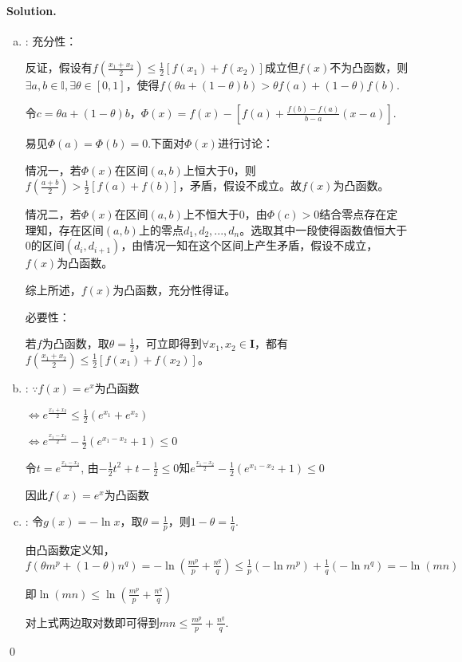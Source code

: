\documentclass[a4paper]{article}
\newenvironment{solution}
{\color{blue} \paragraph{Solution.}}
{\newline \qed}
\begin{document}
\begin{solution}
    \begin{enumerate}[a)]
        \item : 充分性：
        
                反证，假设有$f\left(\frac{x_1+x_2}{2}\right)\leq \frac{1}{2}[f(x_1)+f(x_2)]$成立但$f(x)$不为凸函数，则$\exists a,b\in\mathbb{I},\exists \theta\in[0,1]$，使得$f(\theta a+(1-\theta)b)>\theta f(a)+(1-\theta)f(b)$.

                令$c = \theta a+ (1-\theta)b$，$\Phi(x)=f(x)-\left[f(a)+\frac{f(b)-f(a)}{b-a}(x-a)\right]$.

                易见$\Phi(a)=\Phi(b)=0$.下面对$\Phi(x)$进行讨论：

                情况一，若$\Phi(x)$在区间$(a, b)$上恒大于0，则$f(\frac{a+b}2)>\frac 12\left[f(a)+f(b)\right]$，矛盾，假设不成立。故$f(x)$为凸函数。

                情况二，若$\Phi(x)$在区间$(a, b)$上不恒大于0，由$\Phi(c)>0$结合零点存在定理知，存在区间$(a, b)$上的零点$d_1, d_2, ...,d_n$。选取其中一段使得函数值恒大于0的区间$(d_i, d_{i+1})$，由情况一知在这个区间上产生矛盾，假设不成立，$f(x)$为凸函数。

                综上所述，$f(x)$为凸函数，充分性得证。

                必要性：

                若$f$为凸函数，取$\theta=\frac 12$，可立即得到$\forall x_1,x_2\in\mathbf{I}$，都有$f\left(\frac{x_1+x_2}{2}\right)\leq \frac{1}{2}[f(x_1)+f(x_2)]$。
        
        \item : $\because f(x)=e^x$为凸函数
        
                $\Leftrightarrow e^{\frac{x_1+x_2}2}\leq \frac 12(e^{x_1}+e^{x_2})$

                $\Leftrightarrow e^{\frac{x_1-x_2}2}-\frac 12(e^{x_1-x_2}+1)\leq 0$

                令$t=e^\frac {x_1-x_2}2$, 由$-\frac 12 t^2+t-\frac 12\leq 0$知$e^{\frac{x_1-x_2}2}-\frac 12(e^{x_1-x_2}+1)\leq 0$

                因此$f(x)=e^x$为凸函数

        \item : 令$g(x)=-\ln x$，取$\theta=\frac 1p$，则$1-\theta=\frac 1q$.
        
                由凸函数定义知，$f(\theta m^p+(1-\theta)n^q)=-\ln(\frac{m^p}p+\frac{n^q}q)\leq\frac 1p(-\ln m^p)+\frac 1q(-\ln n^q)=-\ln(mn)$

                即$\ln(mn)\leq\ln(\frac{m^p}p+\frac{n^q}q)$

                对上式两边取对数即可得到$mn\leq\frac{m^p}{p}+\frac{n^q}{q}$.


    \end{enumerate}
\end{solution}
\end{document}
